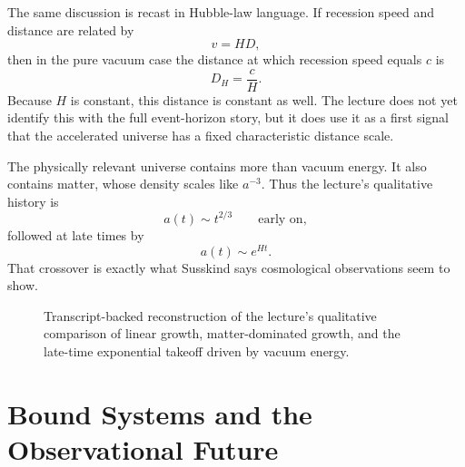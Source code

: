 The same discussion is recast in Hubble-law language. If recession speed and distance are related by
\begin{equation}
v=HD,
\end{equation}
then in the pure vacuum case the distance at which recession speed equals \(c\) is
\begin{equation}
D_H=\frac{c}{H}.
\end{equation}
Because \(H\) is constant, this distance is constant as well. The lecture does not yet identify this with the full event-horizon story, but it does use it as a first signal that the accelerated universe has a fixed characteristic distance scale.

The physically relevant universe contains more than vacuum energy. It also contains matter, whose density scales like \(a^{-3}\). Thus the lecture's qualitative history is
\begin{equation}
a(t)\sim t^{2/3}\qquad\text{early on},
\end{equation}
followed at late times by
\begin{equation}
a(t)\sim e^{Ht}.
\end{equation}
That crossover is exactly what Susskind says cosmological observations seem to show.

\begin{figure}[htbp]
\centering
{}
\caption{Transcript-backed reconstruction of the lecture's qualitative comparison of linear growth, matter-dominated growth, and the late-time exponential takeoff driven by vacuum energy.}
\end{figure}

\section{Bound Systems and the Observational Future}

